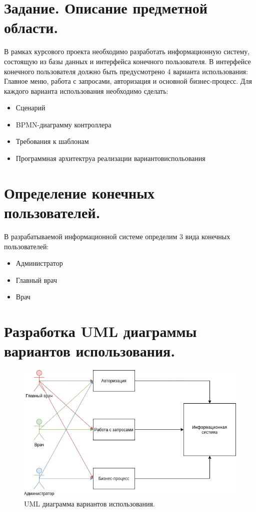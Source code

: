 \documentclass[12pt, a4paper]{article}
\begin{document}
	\section{Задание. Описание предметной области.}
	В рамках курсового проекта необходимо разработать информационную систему, состоящую
	из базы данных и интерфейса конечного пользователя. В интерфейсе конечного
	пользователя должно быть предусмотрено 4 варианта использования: Главное меню, работа
	с запросами, авторизация и основной бизнес-процесс. Для каждого варианта использования
	необходимо сделать:
	
	\begin{itemize}
		\item Сценарий
		\item BPMN-диаграмму контроллера
		\item Требования к шаблонам
		\item Программная архитектруа реализации вариантовиспольования
	\end{itemize}
	
	\section{Определение конечных пользователей.}
	В разрабатываемой информационной системе определим 3 вида конечных пользователей:
	\begin{itemize}
		\item Администратор
		\item Главный врач
		\item Врач
	\end{itemize}
    \newpage

    \section{Разработка UML диаграммы вариантов использования.}
	\begin{figure}[h]
		\centering    %
		\includegraphics[width=1\textwidth]{pictures/UML_variants_using.png}
		\caption{UML диаграмма вариантов использования.} %
		\label{fig:pic1} %
	\end{figure}
\end{document}
